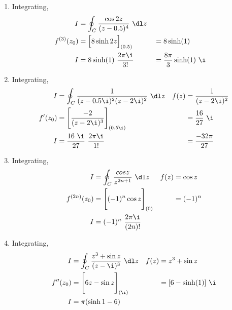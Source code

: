 \begin{enumerate}
    \item Integrating,
          \begin{align}
              I            & = \oint_C \frac{\cos 2z}{(z - 0.5)^4}\ \dl z   \\
              f^{(3)}(z_0) & = \Big[ 8\sinh 2z \Big]_{(0.5)}              &
                           & = 8\sinh(1)                                    \\
              I            & = 8\sinh(1)\ \frac{2\pi\i}{3!}               &
                           & = \frac{8\pi}{3} \sinh(1)\ \i
          \end{align}

    \item Integrating,
          \begin{align}
              I       & = \oint_C \frac{1}{(z - 0.5\i)^2(z - 2\i)^2}\ \dl z &
              f(z)    & = \frac{1}{(z-2\i)^2}                                 \\
              f'(z_0) & = \Bigg[ \frac{-2}{(z - 2\i)^3} \Bigg]_{(0.5\i)}    &
                      & = \frac{16}{27}\ \i                                   \\
              I       & = \frac{16\ \i}{27}\ \frac{2\pi\i}{1!}              &
                      & = \frac{-32\pi}{27}
          \end{align}

    \item Integrating,
          \begin{align}
              I             & = \oint_C \frac{cos z}{z^{2n+1}}\ \dl z &
              f(z)          & = \cos z                                  \\
              f^{(2n)}(z_0) & = \Bigg[ (-1)^n \cos z \Bigg]_{(0)}     &
                            & = (-1)^n                                  \\
              I             & = (-1)^n\ \frac{2\pi\i}{(2n)!}
          \end{align}

    \item Integrating,
          \begin{align}
              I        & = \oint_C \frac{z^3 + \sin z}{(z - \i)^3}\ \dl z &
              f(z)     & = z^3 + \sin z                                     \\
              f''(z_0) & = \Bigg[ 6z - \sin z \Bigg]_{(\i)}               &
                       & = [6 - \sinh(1)]\ \i                               \\
              I        & = \pi(\sinh 1 - 6)
          \end{align}


\end{enumerate}
